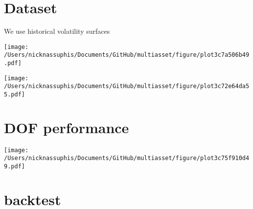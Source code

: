 \documentclass{article}\usepackage[]{graphicx}\usepackage[]{color}
\begin{document}
\tableofcontents

\newpage
\section{Dataset}

We use historical volatility surfaces 

\begin{minipage}[t][ 10cm ][t]{ 10cm }
\texttt{[image: /Users/nicknassuphis/Documents/GitHub/multiasset/figure/plot3c7a506b49.pdf]}
\end{minipage}

\begin{minipage}[t][ 10cm ][t]{ 10cm }
\texttt{[image: /Users/nicknassuphis/Documents/GitHub/multiasset/figure/plot3c72e64da55.pdf]}
\end{minipage}


\newpage
\section{DOF performance}

\begin{center}
\begin{minipage}[t][ 10cm ][t]{ 10cm }
\texttt{[image: /Users/nicknassuphis/Documents/GitHub/multiasset/figure/plot3c75f910d49.pdf]}
\end{minipage}
\end{center}

\newpage
\section{backtest}
\end{document}
